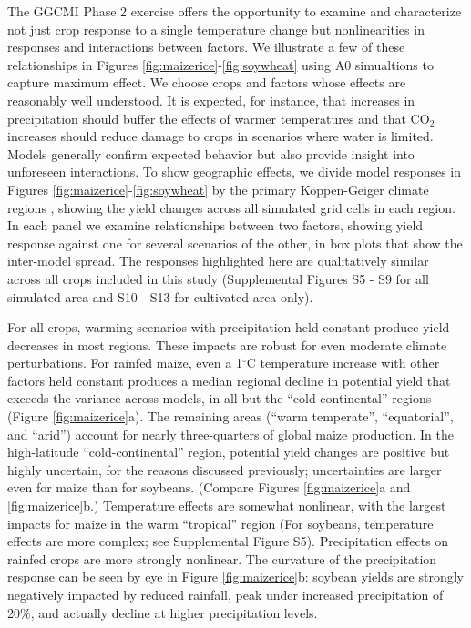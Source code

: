\documentclass[gmd, manuscript]{copernicus} %
\begin{document}
The GGCMI Phase 2 exercise offers the opportunity to examine and characterize not just crop response to a single temperature change but nonlinearities in responses and interactions between factors. 
We illustrate a few of these relationships in Figures \ref{fig:maizerice}-\ref{fig:soywheat} using A0 simualtions to capture maximum effect.
We choose crops and factors whose effects are reasonably well understood. 
It is expected, for instance, that increases in precipitation should buffer the effects of warmer temperatures and that CO$_2$ increases should reduce damage to crops in scenarios where water is limited. 
Models generally confirm expected behavior but also provide insight into unforeseen interactions. 
To show geographic effects, we divide model responses in Figures \ref{fig:maizerice}-\ref{fig:soywheat} by the primary K\"{o}ppen-Geiger climate regions \citep{rubel2010}, showing the yield changes across all simulated grid cells in each region. 
In each panel we examine relationships between two factors, showing yield response against one for several scenarios of the other, in box plots that show the inter-model spread. 
The responses highlighted here are qualitatively similar across all crops included in this study (Supplemental Figures S5 - S9 for all simulated area and S10 - S13 for cultivated area only). 

For all crops, warming scenarios with precipitation held constant produce yield decreases in most regions. 
These impacts are robust for even moderate climate perturbations. 
For rainfed maize, even a 1$^\circ$C temperature increase with other factors held constant produces a median regional decline in potential yield that exceeds the variance across models, in all but the ``cold-continental'' regions (Figure \ref{fig:maizerice}a). 
The remaining areas (``warm temperate'', ``equatorial'', and ``arid'') account for nearly three-quarters of global maize production. In the high-latitude ``cold-continental'' region, potential yield changes are positive but highly uncertain, for the reasons discussed previously; uncertainties are larger even for maize than for soybeans. 
(Compare Figures \ref{fig:maizerice}a and \ref{fig:maizerice}b.) 
Temperature effects are somewhat nonlinear, with the largest impacts for maize in the warm ``tropical'' region  
(For soybeans, temperature effects are more complex; see Supplemental Figure S5). 
Precipitation effects on rainfed crops are more strongly nonlinear. 
The curvature of the precipitation response can be seen by eye in Figure \ref{fig:maizerice}b: soybean yields are strongly negatively impacted by reduced rainfall, peak under increased precipitation of 20\%, and actually decline at higher precipitation levels. 
\end{document}
